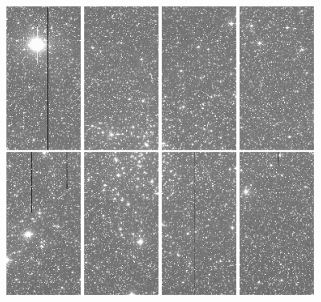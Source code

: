 \documentclass[12pt]{article}
\begin{document}
\begin{figure}[H]
  \centering
   \includegraphics[width = 4in]{mosaicoB.png}
\end{figure}
\end{document}
